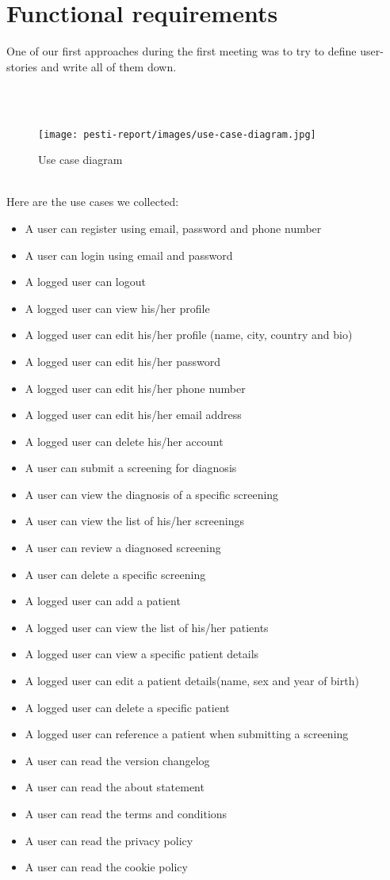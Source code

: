 \section{Functional requirements}

One of our first approaches during the first meeting was to try to define user-stories and write all of them down.

\\ \\
\begin{figure}[H]
	\centering
	\texttt{[image: pesti-report/images/use-case-diagram.jpg]}
	\caption{Use case diagram}
	\label{fig:use-case-diagram}
\end{figure}

\\
Here are the use cases we collected:

\begin{itemize}
\item
A user can register using email, password and phone number
\item
A user can login using email and password
\item
A logged user can logout
\item
A logged user can view his/her profile
\item
A logged user can edit his/her profile (name, city, country and bio)
\item
A logged user can edit his/her password
\item
A logged user can edit his/her phone number
\item
A logged user can edit his/her email address
\item
A logged user can delete his/her account
\item
A user can submit a screening for diagnosis
\item
A user can view the diagnosis of a specific screening
\item
A user can view the list of his/her screenings
\item
A user can review a diagnosed screening
\item
A user can delete a specific screening
\item
A logged user can add a patient
\item
A logged user can view the list of his/her patients
\item
A logged user can view a specific patient details
\item
A logged user can edit a patient details(name, sex and year of birth)
\item
A logged user can delete a specific patient
\item
A logged user can reference a patient when submitting a screening
\item
A user can read the version changelog
\item
A user can read the about statement
\item
A user can read the terms and conditions
\item
A user can read the privacy policy
\item
A user can read the cookie policy
\end{itemize}

